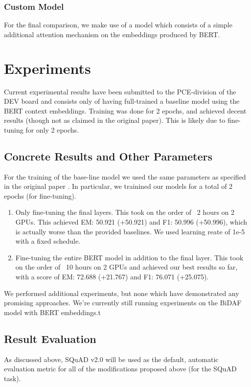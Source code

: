 \documentclass{article}
\begin{document}
\subsubsection{Custom Model}
For the final comparison, we make use of a model which consists of a simple additional attention mechanism on the embeddings produced by BERT.


\section{Experiments}
Current experimental results have been submitted to the PCE-division of the DEV board and consists only of having full-trained a baseline model using the BERT context embeddings. Training was done for 2 epochs, and achieved decent results (though not as claimed in the original paper). This is likely due to fine-tuning for only 2 epochs.

\subsection{Concrete Results and Other Parameters}
For the training of the base-line model we used the same parameters as specified in the original paper \cite{BERT}. In particular, we trainined our models for a total of 2 epochs (for fine-tuning).

\begin{enumerate}
  \item Only fine-tuning the final layers. This took on the order of ~2 hours on 2 GPUs. This achieved EM: 50.921 (+50.921) and F1: 50.996 (+50.996), which is actually worse than the provided baselines. We used learning reate of 1e-5 with a fixed schedule. 
  \item Fine-tuning the entire BERT model in addition to the final layer. This took on the order of ~10 hours on 2 GPUs and achieved our best results so far, with a score of EM: 72.688 (+21.767) and F1: 76.071 (+25.075). 
\end{enumerate}

We performed additional experiments, but none which have demonstrated any promising approaches. We're currently still running experiments on the BiDAF model with BERT embeddings.t

\subsection{Result Evaluation}
As discussed above, SQuAD v2.0 will be used as the default, automatic evaluation metric for all of the modifications proposed above (for the SQuAD task). 
\end{document}

